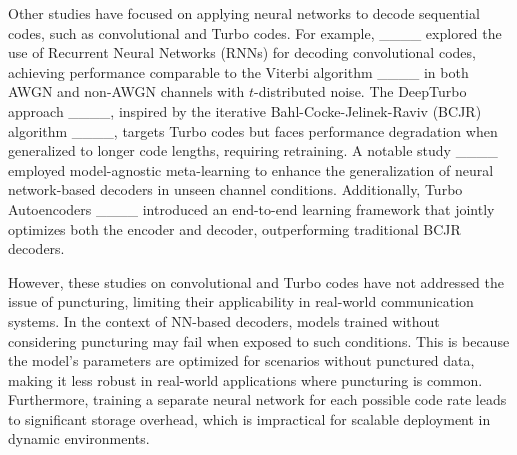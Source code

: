 Other studies have focused on applying neural networks to decode sequential codes, such as convolutional and Turbo codes. For example, ____ explored the use of Recurrent Neural Networks (RNNs) for decoding convolutional codes, achieving performance comparable to the Viterbi algorithm ____ in both AWGN and non-AWGN channels with $t$-distributed noise. The DeepTurbo approach ____, inspired by the iterative Bahl-Cocke-Jelinek-Raviv (BCJR) algorithm ____, targets Turbo codes but faces performance degradation when generalized to longer code lengths, requiring retraining. A notable study ____ employed model-agnostic meta-learning to enhance the generalization of neural network-based decoders in unseen channel conditions. Additionally, Turbo Autoencoders ____ introduced an end-to-end learning framework that jointly optimizes both the encoder and decoder, outperforming traditional BCJR decoders.

However, these studies on convolutional and Turbo codes have not addressed the issue of puncturing, limiting their applicability in real-world communication systems. In the context of NN-based decoders, models trained without considering puncturing may fail when exposed to such conditions. This is because the model's parameters are optimized for scenarios without punctured data, making it less robust in real-world applications where puncturing is common. Furthermore, training a separate neural network for each possible code rate leads to significant storage overhead, which is impractical for scalable deployment in dynamic environments.